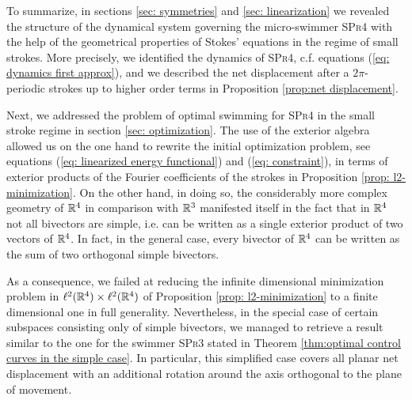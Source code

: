 To summarize, in sections \ref{sec: symmetries} and \ref{sec: linearization} we revealed the structure of the dynamical system governing the micro-swimmer \textsc{SPr4} with the help of the geometrical properties of Stokes' equations in the regime of small strokes. More precisely, we identified the dynamics of \textsc{SPr4}, c.f. equations (\ref{eq: dynamics first approx}), and we described the net displacement after a $2\pi$-periodic strokes up to higher order terms in Proposition \ref{prop:net displacement}. 

Next, we addressed the problem of optimal swimming for \textsc{SPr4} in the small stroke regime in section \ref{sec: optimization}. The use of the exterior algebra allowed us on the one hand to rewrite the initial optimization problem, see equations (\ref{eq: linearized energy functional}) and (\ref{eq: constraint}), in terms of exterior products of the Fourier coefficients of the strokes in Proposition \ref{prop: l2-minimization}. On the other hand, in doing so, the considerably more complex geometry of $\mathbb{R}^4$ in comparison with $\mathbb{R}^3$ manifested itself in the fact that in $\mathbb{R}^4$ not all bivectors are simple, i.e. can be written as a single exterior product of two vectors of $\mathbb{R}^4$. In fact, in the general case, every bivector of $\mathbb{R}^4$ can be written as the sum of two orthogonal simple bivectors.

As a consequence, we failed at reducing the infinite dimensional minimization problem in $\ell^2(\mathbb{R}^4) \times \ell^2(\mathbb{R}^4)$ of Proposition \ref{prop: l2-minimization} to a finite dimensional one in full generality. Nevertheless, in the special case of certain subspaces consisting only of simple bivectors, we managed to retrieve a result similar to the one for the swimmer \textsc{SPr3} stated in Theorem \ref{thm:optimal control curves in the simple case}. In particular, this simplified case covers all planar net displacement with an additional rotation around the axis orthogonal to the plane of movement.

